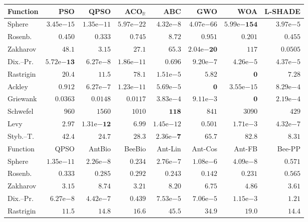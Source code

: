 \begin{tabular}{lrrrrrrr}
\toprule
Function & PSO & QPSO & ACO$_\mathbb{R}$ & ABC & GWO & WOA & L-SHADE \\
\midrule
Sphere & $3.45\mathrm{e}{-15}$ & $1.35\mathrm{e}{-11}$ & $5.97\mathrm{e}{-22}$ & $4.32\mathrm{e}{-8}$ & $4.07\mathrm{e}{-66}$ & $\mathbf{5.99\mathrm{e}{-154}}$ & $3.97\mathrm{e}{-5}$ \\
Rosenb. & $0.450$ & $0.333$ & $0.745$ & $8.72$ & $0.951$ & $0.201$ & $0.455$ \\
Zakharov & $48.1$ & $3.15$ & $27.1$ & $65.3$ & $\mathbf{2.04\mathrm{e}{-20}}$ & $117$ & $0.0505$ \\
Dix.--Pr. & $\mathbf{5.72\mathrm{e}{-13}}$ & $6.27\mathrm{e}{-8}$ & $1.86\mathrm{e}{-11}$ & $0.696$ & $9.20\mathrm{e}{-7}$ & $4.26\mathrm{e}{-5}$ & $4.37\mathrm{e}{-5}$ \\
Rastrigin & $20.4$ & $11.5$ & $78.1$ & $1.51\mathrm{e}{-5}$ & $5.82$ & $\mathbf{0}$ & $7.28$ \\
Ackley & $0.912$ & $6.27\mathrm{e}{-7}$ & $1.23\mathrm{e}{-11}$ & $5.69\mathrm{e}{-5}$ & $\mathbf{0}$ & $3.55\mathrm{e}{-15}$ & $8.29\mathrm{e}{-4}$ \\
Griewank & $0.0363$ & $0.0148$ & $0.0117$ & $3.83\mathrm{e}{-4}$ & $9.11\mathrm{e}{-3}$ & $\mathbf{0}$ & $2.19\mathrm{e}{-4}$ \\
Schwefel & $960$ & $1560$ & $1010$ & $\mathbf{118}$ & $841$ & $3090$ & $429$ \\
Levy & $2.97$ & $\mathbf{1.31\mathrm{e}{-12}}$ & $6.99$ & $1.45\mathrm{e}{-12}$ & $0.501$ & $1.71\mathrm{e}{-3}$ & $4.32\mathrm{e}{-7}$ \\
Styb.--T. & $42.4$ & $24.7$ & $28.3$ & $\mathbf{2.36\mathrm{e}{-7}}$ & $65.7$ & $82.8$ & $8.31$ \\
\midrule
Function & QPSO & AntBio & BeeBio & Ant-Lin & Ant-Cos & Ant-FB & Bee-PP \\
\midrule
Sphere & $1.35\mathrm{e}{-11}$ & $2.26\mathrm{e}{-8}$ & $0.234$ & $2.76\mathrm{e}{-7}$ & $1.08\mathrm{e}{-6}$ & $4.09\mathrm{e}{-8}$ & $0.571$ \\
Rosenb. & $0.333$ & $0.285$ & $0.292$ & $0.243$ & $\mathbf{0.142}$ & $0.231$ & $0.565$ \\
Zakharov & $3.15$ & $8.74$ & $3.21$ & $8.20$ & $6.75$ & $4.86$ & $3.61$ \\
Dix.--Pr. & $6.27\mathrm{e}{-8}$ & $4.42\mathrm{e}{-7}$ & $0.439$ & $7.53\mathrm{e}{-5}$ & $7.06\mathrm{e}{-5}$ & $1.15\mathrm{e}{-3}$ & $1.21$ \\
Rastrigin & $11.5$ & $14.8$ & $16.6$ & $45.5$ & $34.9$ & $19.0$ & $14.4$ \\

\end{tabular}
